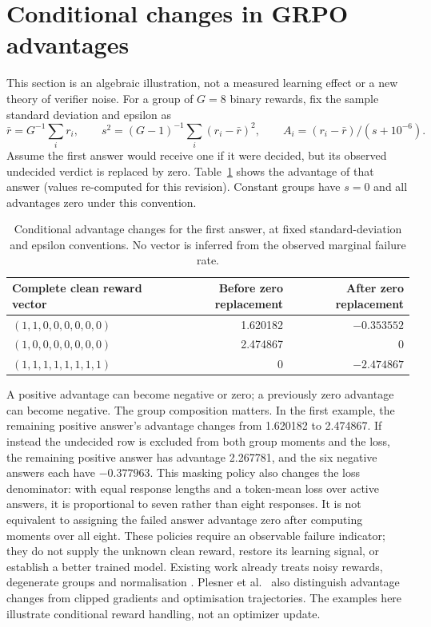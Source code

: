 \documentclass[11pt,a4paper]{article}
\begin{document}
\section{Conditional changes in GRPO advantages}\label{sec:adv}
This section is an algebraic illustration, not a measured learning effect or a new theory of verifier noise. For a group of $G=8$ binary rewards, fix the sample standard deviation and epsilon as
\[\bar r = G^{-1}\sum_i r_i,\qquad s^2=(G-1)^{-1}\sum_i (r_i-\bar r)^2,\qquad A_i=(r_i-\bar r)/(s+10^{-6}).\]
Assume the first answer would receive one if it were decided, but its observed undecided verdict is replaced by zero. Table~\ref{tab:adv} shows the advantage of that answer (values re-computed for this revision). Constant groups have $s=0$ and all advantages zero under this convention.

\begin{table}[h]\centering\small
\caption{Conditional advantage changes for the first answer, at fixed standard-deviation and epsilon conventions. No vector is inferred from the observed marginal failure rate.}\label{tab:adv}
\begin{tabular}{@{}lrr@{}}\toprule
Complete clean reward vector & Before zero replacement & After zero replacement\\\midrule
$(1,1,0,0,0,0,0,0)$ & 1.620182 & $-0.353552$\\
$(1,0,0,0,0,0,0,0)$ & 2.474867 & 0\\
$(1,1,1,1,1,1,1,1)$ & 0 & $-2.474867$\\\bottomrule
\end{tabular}
\end{table}

A positive advantage can become negative or zero; a previously zero advantage can become negative. The group composition matters. In the first example, the remaining positive answer's advantage changes from 1.620182 to 2.474867. If instead the undecided row is excluded from both group moments and the loss, the remaining positive answer has advantage 2.267781, and the six negative answers each have $-0.377963$. This masking policy also changes the loss denominator: with equal response lengths and a token-mean loss over active answers, it is proportional to seven rather than eight responses. It is not equivalent to assigning the failed answer advantage zero after computing moments over all eight. These policies require an observable failure indicator; they do not supply the unknown clean reward, restore its learning signal, or establish a better trained model. Existing work already treats noisy rewards, degenerate groups and normalisation \cite{cai,nie,yang}. Plesner et al.\ \cite{plesner} also distinguish advantage changes from clipped gradients and optimisation trajectories. The examples here illustrate conditional reward handling, not an optimizer update.
\end{document}
